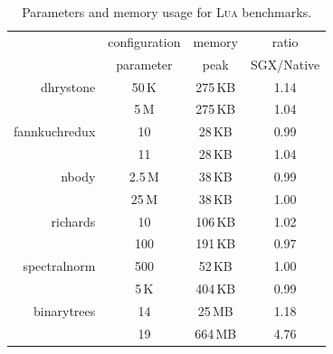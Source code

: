 \newcommand{\higparamcolor}{\rowcolor[rgb]{0.79,0.91,0.90}\cellcolor{white}}
\newcommand{\lowparamcolor}{\rowcolor[rgb]{0.94,0.88,0.76}\cellcolor{white}}
\begin{table}[t!]
    \centering
    \begin{tabular}{r|c|c|c}
                       &configuration &memory      &ratio \\
                       &parameter     &peak        &SGX/Native \\
\hline
\lowparamcolor
\textsf{dhrystone}     &50\,K      &275\,KB       & 1.14 \\
\higparamcolor
                       &5\,M       &275\,KB       & 1.04 \\
\hline
\lowparamcolor
\textsf{fannkuchredux} &10         &28\,KB        & 0.99 \\
\higparamcolor
                       &11         &28\,KB        & 1.04 \\
\hline
\lowparamcolor
\textsf{nbody}         &2.5\,M     &38\,KB        & 0.99 \\
\higparamcolor
                       &25\,M      &38\,KB        & 1.00 \\
\hline
\lowparamcolor
\textsf{richards}      &10         &106\,KB       & 1.02 \\
\higparamcolor
                       &100        &191\,KB       & 0.97 \\
\hline
\lowparamcolor
\textsf{spectralnorm}  &500        &52\,KB        & 1.00 \\
\higparamcolor
                       &5\,K       &404\,KB       & 0.99 \\
\hline
\lowparamcolor
\textsf{binarytrees}   &14         &25\,MB        & 1.18 \\
\higparamcolor
                       &19         &664\,MB       & 4.76 \\
    \end{tabular}
    \caption{Parameters and memory usage for \textsc{Lua} benchmarks.}
  \label{tab:luabmarks}
\end{table}



